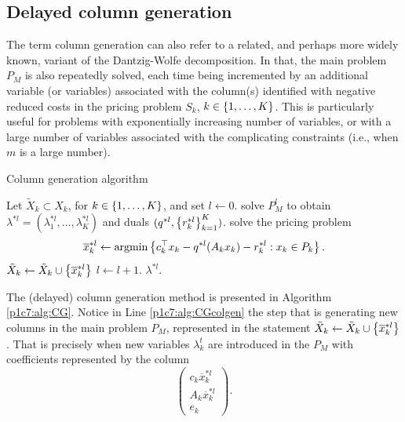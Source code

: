 \subsection{Delayed column generation}
 
The term column generation can also refer to a related, and perhaps more widely known, variant of the Dantzig-Wolfe decomposition. In that, the main problem $P_M$ is also repeatedly solved, each time being incremented by an additional variable (or variables) associated with the column(s) identified with negative reduced costs in the pricing problem $S_k$, $k \in \left\{ 1,\dots,K \right \}$. This is particularly useful for problems with exponentially increasing number of variables, or with a large number of variables associated with the complicating constraints (i.e., when $m$ is a large number).

\begin{algorithm}[h]
    \caption{Column generation algorithm} \label{p1c7:alg:CG}
    \begin{algorithmic}[1] %
    Let $\tilde{X}_k \subset X_k$, for $k \in \left\{ 1,\dots,K \right \}$, and set
    $l \gets 0$. 
    	\Repeat \label{Alg2:loop}
        \State solve $P_M^l$ to obtain $\lambda^{*l} = (\lambda_1^{*l},\dots, \lambda_K^{*l})$ and duals $(q^{*l}, \left\{ r_k^{*l} \right \}_{k=1}^K)$.
            \State solve the pricing problem
            $$\overline{x}^{*l}_k \gets \mathop{\rm argmin} \left\{ c_k^\top x_k - q^{*l}(A_kx_k) - r^{*l}_k : x_k \in P_k \right \}.
            $$
             $\tilde{X}_k \gets \tilde{X}_k \cup \left\{ \overline{x}^{*l}_k \right \}$ \label{p1c7:alg:CGcolgen}
            \EndIf  
        \EndFor
        \State $l \gets l + 1$.
     $\lambda^{*l}$.
    \end{algorithmic}
\end{algorithm}

The (delayed) column generation method is presented in Algorithm \ref{p1c7:alg:CG}. Notice in Line \ref{p1c7:alg:CGcolgen} the step that is generating new columns in the main problem $P_M$, represented in the statement $\tilde{X}_k \gets \tilde{X}_k \cup \left\{ \overline{x}^{*l}_k \right \}$. That is precisely when new variables $\lambda_k^{t}$ are introduced in the $P_M$ with coefficients represented by the column
%
\begin{equation*}
	\begin{pmatrix}
            c_k\overline{x}_k^{*l}\\
            A_k\overline{x}_k^{*l}\\
            e_k
    \end{pmatrix}.
\end{equation*}


